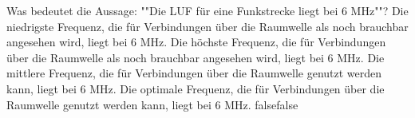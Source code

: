     {Was bedeutet die Aussage: ""Die LUF für eine Funkstrecke liegt bei 6 MHz""?}
    {Die niedrigste Frequenz, die für Verbindungen über die Raumwelle als noch brauchbar angesehen wird, liegt bei 6 MHz.}
    {Die höchste Frequenz, die für Verbindungen über die Raumwelle als noch brauchbar angesehen wird, liegt bei 6 MHz.}
    {Die mittlere Frequenz, die für Verbindungen über die Raumwelle genutzt werden kann, liegt bei 6 MHz.}
    {Die optimale Frequenz, die für Verbindungen über die Raumwelle genutzt werden kann, liegt bei 6 MHz.}
    {false}{false}